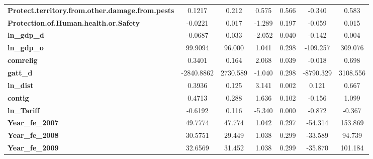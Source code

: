 \begin{center}
\begin{tabular}{lcccccc}
\textbf{Protect.territory.from.other.damage.from.pests}            &       0.1217  &        0.212     &     0.575  &         0.566        &       -0.340    &        0.583     \\
\textbf{Protection.of.Human.health.or.Safety}                      &      -0.0221  &        0.017     &    -1.289  &         0.197        &       -0.059    &        0.015     \\
\textbf{ln\_gdp\_d}                                                &      -0.0687  &        0.033     &    -2.052  &         0.040        &       -0.142    &        0.004     \\
\textbf{ln\_gdp\_o}                                                &      99.9094  &       96.000     &     1.041  &         0.298        &     -109.257    &      309.076     \\
\textbf{comrelig}                                                  &       0.3401  &        0.164     &     2.068  &         0.039        &       -0.018    &        0.698     \\
\textbf{gatt\_d}                                                   &   -2840.8862  &     2730.589     &    -1.040  &         0.298        &    -8790.329    &     3108.556     \\
\textbf{ln\_dist}                                                  &       0.3936  &        0.125     &     3.141  &         0.002        &        0.121    &        0.667     \\
\textbf{contig}                                                    &       0.4713  &        0.288     &     1.636  &         0.102        &       -0.156    &        1.099     \\
\textbf{ln\_Tariff}                                                &      -0.6192  &        0.116     &    -5.340  &         0.000        &       -0.872    &       -0.367     \\
\textbf{Year\_fe\_2007}                                            &      49.7774  &       47.774     &     1.042  &         0.297        &      -54.314    &      153.869     \\
\textbf{Year\_fe\_2008}                                            &      30.5751  &       29.449     &     1.038  &         0.299        &      -33.589    &       94.739     \\
\textbf{Year\_fe\_2009}                                            &      32.6569  &       31.452     &     1.038  &         0.299        &      -35.870    &      101.184     \\

\end{tabular}
\end{center}
